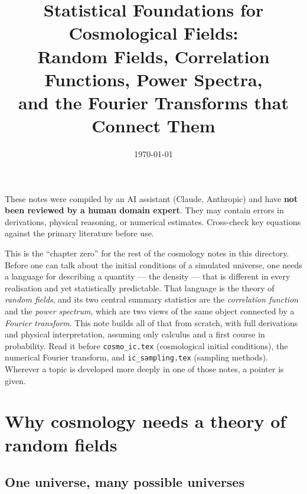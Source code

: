 \documentclass[12pt]{article}
\title{Statistical Foundations for Cosmological Fields:\\
       Random Fields, Correlation Functions, Power Spectra,\\
       and the Fourier Transforms that Connect Them}
\author{}
\date{\today}
\newcommand{\code}[1]{\texttt{#1}}
\begin{document}
\maketitle

\begin{tcolorbox}[colback=yellow!10!white, colframe=orange!75!black,
                  title={\bfseries Disclaimer}]
These notes were compiled by an AI assistant (Claude, Anthropic) and have
\textbf{not been reviewed by a human domain expert}.  They may contain
errors in derivations, physical reasoning, or numerical estimates.
Cross-check key equations against the primary literature before use.
\end{tcolorbox}
\vspace{0.5em}

\begin{tcolorbox}[colback=blue!5!white, colframe=blue!60!black,
                  title={\bfseries What this note is for}]
This is the ``chapter zero'' for the rest of the cosmology notes in this
directory.  Before one can talk about the initial conditions of a
simulated universe, one needs a language for describing a quantity ---
the density --- that is different in every realisation and yet
statistically predictable.  That language is the theory of \emph{random
fields}, and its two central summary statistics are the
\emph{correlation function} and the \emph{power spectrum}, which are two
views of the same object connected by a \emph{Fourier transform}.  This
note builds all of that from scratch, with full derivations and physical
interpretation, assuming only calculus and a first course in
probability.  Read it before \code{cosmo\_ic.tex} (cosmological initial
conditions), the numerical Fourier transform, and
\code{ic\_sampling.tex} (sampling methods).  Wherever a topic is
developed more deeply in one of those notes, a pointer is given.
\end{tcolorbox}

\tableofcontents
\newpage

\section{Why cosmology needs a theory of random fields}
\label{sec:why}

\subsection{One universe, many possible universes}
\end{document}
